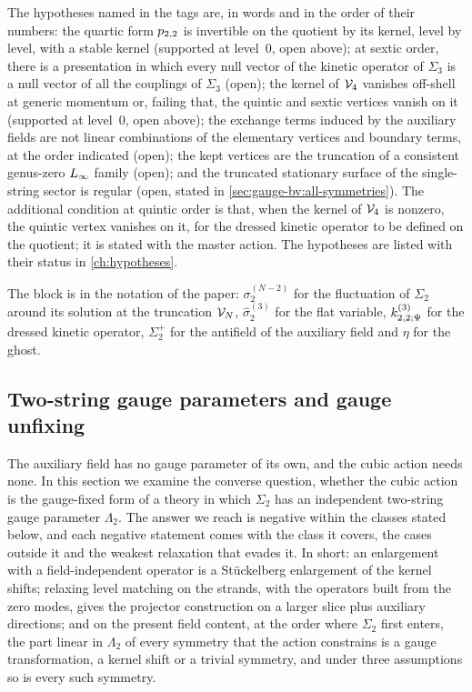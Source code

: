 The hypotheses named in the tags are, in words and in the order of their numbers: the quartic form $p_{2,2}$ is invertible on the quotient by its kernel, level by level, with a stable kernel (supported at level~$0$, open above); at sextic order, there is a presentation in which every null vector of the kinetic operator of $\Sigma_3$ is a null vector of all the couplings of $\Sigma_3$ (open); the kernel of $\mathcal{V}_{4}$ vanishes off-shell at generic momentum or, failing that, the quintic and sextic vertices vanish on it (supported at level~$0$, open above); the exchange terms induced by the auxiliary fields are not linear combinations of the elementary vertices and boundary terms, at the order indicated (open); the kept vertices are the truncation of a consistent genus-zero $L_\infty$ family (open); and the truncated stationary surface of the single-string sector is regular (open, stated in \cref{sec:gauge-bv:all-symmetries}).
The additional condition at quintic order is that, when the kernel of $\mathcal{V}_{4}$ is nonzero, the quintic vertex vanishes on it, for the dressed kinetic operator to be defined on the quotient; it is stated with the master action.
The hypotheses are listed with their status in \cref{ch:hypotheses}.

The block is in the notation of the paper: $\sigma_2^{(N-2)}$ for the fluctuation of $\Sigma_2$ around its solution at the truncation $\mathcal{V}_{N}$, $\hat\sigma_2^{(3)}$ for the flat variable, $\kin{2}{\Psi}{3}$ for the dressed kinetic operator, $\Sigma_2^+$ for the antifield of the auxiliary field and $\eta$ for the ghost.



\subsection{Two-string gauge parameters and gauge unfixing}
\label{sec:gauge-bv:unfixing}

The auxiliary field has no gauge parameter of its own, and the cubic action needs none.
In this section we examine the converse question, whether the cubic action is the gauge-fixed form of a theory in which $\Sigma_2$ has an independent two-string gauge parameter $\Lambda_2$.
The answer we reach is negative within the classes stated below, and each negative statement comes with the class it covers, the cases outside it and the weakest relaxation that evades it.
In short: an enlargement with a field-independent operator is a Stückelberg enlargement of the kernel shifts; relaxing level matching on the strands, with the operators built from the zero modes, gives the projector construction on a larger slice plus auxiliary directions; and on the present field content, at the order where $\Sigma_2$ first enters, the part linear in $\Lambda_2$ of every symmetry that the action constrains is a gauge transformation, a kernel shift or a trivial symmetry, and under three assumptions so is every such symmetry.

